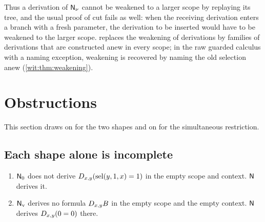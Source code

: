 Thus a derivation of $\mathsf{N}_{\nu}$ cannot be weakened to a larger scope by
replaying its tree, and the usual proof of cut fails as well: when the
receiving derivation enters a branch with a fresh parameter, the derivation
to be inserted would have to be weakened to the larger scope.
 replaces the weakening of derivations by families of
derivations that are constructed anew in every scope; in the raw guarded
calculus with a naming exception, weakening is recovered by naming the old
selection anew (\cref{wit:thm:weakening}).

\section{Obstructions}
\label{wit:sec:obstructions}

This section draws on  for the two shapes and on
 for the simultaneous restriction.

\subsection{Each shape alone is incomplete}

\begin{proposition}
\label{wit:prop:shapes}
\begin{enumerate}[label=\textup{(\roman*)}]
\item $\mathsf{N}_{0}$ does not derive $D_{x,y}(\operatorname{sel}(y,1,x)=1)$ in the empty
 scope and context.  $\mathsf{N}$ derives it.
\item $\mathsf{N}_{\mathrm v}$ derives no formula $D_{x,y}B$ in the empty scope
 and the empty context.  $\mathsf{N}$ derives $D_{x,y}(0=0)$ there.
\end{enumerate}
\end{proposition}

